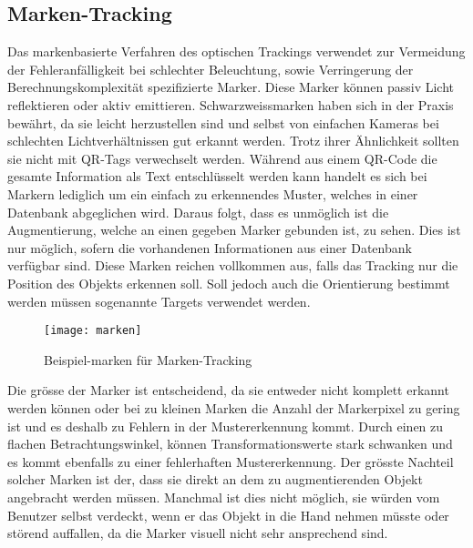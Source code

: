 \subsection*{Marken-Tracking}
Das markenbasierte Verfahren des optischen Trackings verwendet zur Vermeidung der Fehleranfälligkeit bei schlechter Beleuchtung, sowie Verringerung der Berechnungskomplexität spezifizierte Marker. Diese Marker können passiv Licht reflektieren oder aktiv emittieren. Schwarzweissmarken haben sich in der Praxis bewährt, da sie leicht herzustellen sind und selbst von einfachen Kameras bei schlechten Lichtverhältnissen gut erkannt werden. Trotz ihrer Ähnlichkeit sollten sie nicht mit QR-Tags verwechselt werden. Während aus einem QR-Code die gesamte Information als Text entschlüsselt werden kann handelt es sich bei Markern lediglich um ein einfach zu erkennendes Muster, welches in einer Datenbank abgeglichen wird. Daraus folgt, dass es unmöglich ist die Augmentierung, welche an einen gegeben Marker gebunden ist, zu sehen. Dies ist nur möglich, sofern die vorhandenen Informationen aus einer Datenbank verfügbar sind. Diese Marken reichen vollkommen aus, falls das Tracking nur die Position des Objekts erkennen soll. Soll jedoch auch die Orientierung bestimmt werden müssen sogenannte Targets verwendet werden.\cite[S.~104~ff.]{doerner13}
\newpage
\begin{wrapfigure}{r}{0.35\textwidth}
	\vspace{-15pt}
	\begin{center}
		\texttt{[image: marken]}
	\end{center}
	\vspace{-15pt}
	\captionsetup{width=0.3\textwidth}
	\caption{Beispiel-marken für Marken-Tracking}\label{marken}
	\vspace{-12pt}
\end{wrapfigure}
Die grösse der Marker ist entscheidend, da sie entweder nicht komplett erkannt werden können oder bei zu kleinen Marken die Anzahl der Markerpixel zu gering ist und es deshalb zu Fehlern in der Mustererkennung kommt. Durch einen zu flachen Betrachtungswinkel, können Transformationswerte stark schwanken und es kommt ebenfalls zu einer fehlerhaften Mustererkennung. Der grösste Nachteil solcher Marken ist der, dass sie direkt an dem zu augmentierenden Objekt angebracht werden müssen. Manchmal ist dies nicht möglich, sie würden vom Benutzer selbst verdeckt, wenn er das Objekt in die Hand nehmen müsste oder störend auffallen, da die Marker visuell nicht sehr ansprechend sind.\cite[S.~256~ff.]{doerner13}\\[6pt]

